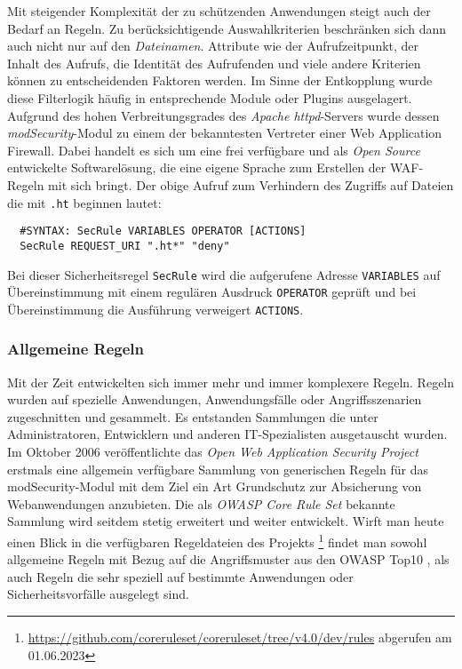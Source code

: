 Mit steigender Komplexität der zu schützenden Anwendungen steigt auch der Bedarf an Regeln. Zu berücksichtigende Auswahlkriterien beschränken sich dann auch nicht nur auf den \glqq\emph{Dateinamen}\grqq. Attribute wie der Aufrufzeitpunkt, der Inhalt des Aufrufs, die Identität des Aufrufenden und viele andere Kriterien können zu entscheidenden Faktoren werden. Im Sinne der Entkopplung wurde diese Filterlogik häufig in entsprechende Module oder Plugins ausgelagert. Aufgrund des hohen Verbreitungsgrades des \emph{Apache httpd}-Servers wurde dessen \emph{modSecurity}-Modul zu einem der bekanntesten Vertreter einer Web Application Firewall. Dabei handelt es sich um eine frei verfügbare und als \emph{Open Source} entwickelte Softwarelösung, die eine eigene Sprache zum Erstellen der WAF-Regeln mit sich bringt. Der obige Aufruf zum Verhindern des Zugriffs auf Dateien die mit \texttt{.ht} beginnen lautet:

\begin{lstlisting}
  #SYNTAX: SecRule VARIABLES OPERATOR [ACTIONS]        
  SecRule REQUEST_URI ".ht*" "deny"
\end{lstlisting}

Bei dieser Sicherheitsregel \verb=SecRule= wird die aufgerufene Adresse \verb=VARIABLES= auf Übereinstimmung mit einem regulären Ausdruck \verb=OPERATOR= geprüft und bei Übereinstimmung die Ausführung verweigert \verb=ACTIONS=.

\subsubsection{Allgemeine Regeln}
Mit der Zeit entwickelten sich immer mehr und immer komplexere Regeln. Regeln wurden auf spezielle Anwendungen, Anwendungsfälle oder Angriffsszenarien zugeschnitten und gesammelt. Es entstanden Sammlungen die unter Administratoren, Entwicklern und anderen IT-Spezialisten ausgetauscht wurden.
Im Oktober 2006 veröffentlichte das \emph{Open Web Application Security Project} erstmals eine allgemein verfügbare Sammlung von generischen Regeln für das modSecurity-Modul mit dem Ziel ein Art Grundschutz zur Absicherung von Webanwendungen anzubieten. Die als \emph{OWASP Core Rule Set} bekannte Sammlung wird seitdem stetig erweitert und weiter entwickelt. Wirft man heute einen Blick in die verfügbaren Regeldateien des Projekts \footnote{\url{https://github.com/coreruleset/coreruleset/tree/v4.0/dev/rules} abgerufen am 01.06.2023} findet man sowohl allgemeine Regeln mit Bezug auf die Angriffsmuster aus den OWASP Top10 \cite{owasp10}, als auch Regeln die sehr speziell auf bestimmte Anwendungen oder Sicherheitsvorfälle ausgelegt sind.


